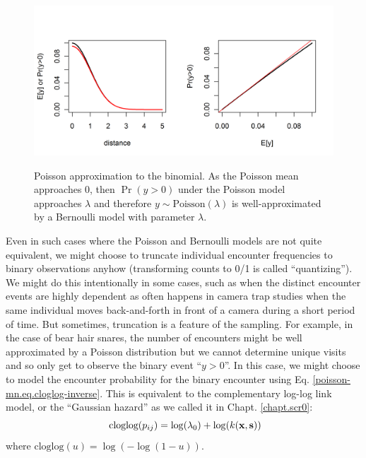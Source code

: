 \begin{figure}
\centering
\includegraphics[width=5in,height=2.5in]{Ch9-PoisMn/figs/Poisson-Bern.png}
\caption{
Poisson approximation to the binomial. As the Poisson mean
approaches 0, then $\Pr(y>0)$ under the Poisson model approaches
$\lambda$ and therefore $y \sim \mbox{Poisson}(\lambda)$ is
well-approximated by a Bernoulli model with parameter $\lambda$.  }
\label{poisson-mn.fig.poissonbern}
\end{figure}

Even in such cases
where the Poisson and
Bernoulli models are
not quite
equivalent, we might choose to truncate
individual encounter frequencies to binary observations anyhow
(transforming counts to 0/1 is called ``quantizing'').  We might do
this intentionally in some cases, such as when the distinct encounter events are
highly dependent as often happens in camera trap studies when the same
individual moves back-and-forth in front of a camera during a short
period of time.
But sometimes,
truncation is a feature of the sampling. For example, in the case of
bear hair snares, the number of encounters might be well approximated
by a Poisson distribution but we cannot determine unique visits and so
only get to observe the binary event ``$y>0$''. 
In this case, we might choose to model the encounter probability for
the binary encounter using
 Eq. \ref{poisson-mn.eq.cloglog-inverse}.
This is equivalent to the complementary log-log link model, or the
``Gaussian hazard'' as we called it in Chapt. \ref{chapt.scr0}:
\[
\mbox{ cloglog}(p_{ij}) = \log(\lambda_{0})  + \log(k({\bf x},{\bf s}))
\]
where $\mbox{cloglog}(u) = \log(-\log(1-u))$.

